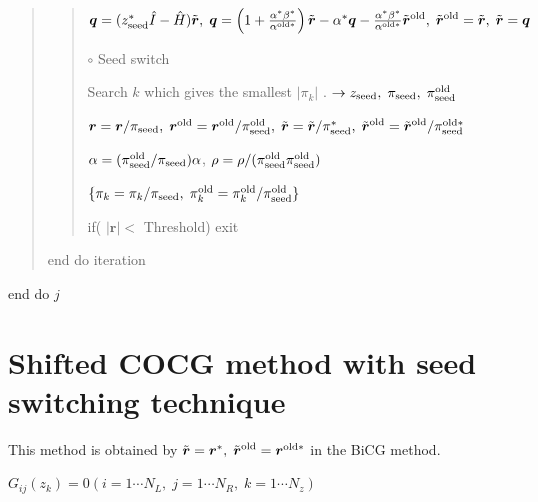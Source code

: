 \documentclass[letterpaper,10pt,dvipdfmx,openany]{sphinxmanual}
\begin{document}
\begin{quote}
\begin{quote}
\({\boldsymbol q} = (z_{\rm seed}^* {\hat I} - {\hat H}) {\tilde {\boldsymbol r}},\; {\boldsymbol q} = \left( 1 + \frac{\alpha^* \beta^*}{\alpha^{{\rm old}*}} \right) {\tilde {\boldsymbol r}} - \alpha^* {\boldsymbol q} - \frac{\alpha^* \beta^*}{\alpha^{{\rm old} *}} {\tilde {\boldsymbol r}}^{\rm old},\; {\tilde {\boldsymbol r}}^{\rm old} = {\tilde {\boldsymbol r}},\; {\tilde {\boldsymbol r}} = {\boldsymbol q}\)

\(\circ\) Seed switch

Search \(k\) which gives the smallest \(|\pi_k|\) . \(\rightarrow z_{\rm seed},\; \pi_{\rm seed},\; \pi_{\rm seed}^{\rm old}\)

\({\boldsymbol r} = {\boldsymbol r} / \pi_{\rm seed},\; {\boldsymbol r}^{\rm old} = {\boldsymbol r}^{\rm old} / \pi_{\rm seed}^{\rm old},\; {\tilde {\boldsymbol r}} = {\tilde {\boldsymbol r}} / \pi_{\rm seed}^*,\; {\tilde {\boldsymbol r}}^{\rm old} = {\tilde {\boldsymbol r}}^{\rm old} / \pi_{\rm seed}^{{\rm old}*}\)

\(\alpha = (\pi_{\rm seed}^{\rm old} / \pi_{\rm seed}) \alpha\), \(\rho = \rho / (\pi_{\rm seed}^{\rm old} \pi_{\rm seed}^{\rm old})\)

\(\{\pi_k = \pi_k / \pi_{\rm seed},\; \pi_k^{\rm old} = \pi_k^{\rm old} / \pi_{\rm seed}^{\rm old}\}\)

if( \(|{\boldsymbol r}| <\) Threshold) exit
\end{quote}

end do iteration
\end{quote}

end do \(j\)


\section{Shifted COCG method with seed switching technique}
\label{komega_algorithm_en:shifted-cocg-method-with-seed-switching-technique}
This method is obtained by
\({\tilde {\boldsymbol r}} = {\boldsymbol r}^*,\; {\tilde {\boldsymbol r}}^{\rm old} = {\boldsymbol r}^{{\rm old}*}\)
in the BiCG method.

\(G_{i j}(z_k) = 0 (i=1 \cdots N_L,\; j = 1 \cdots N_R,\; k=1 \cdots N_z)\)
\end{document}
